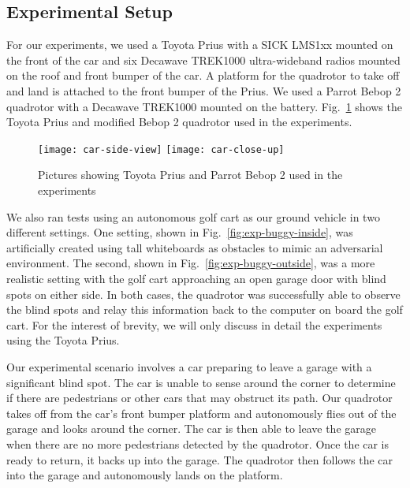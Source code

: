 \subsection{Experimental Setup}

For our experiments, we used a Toyota Prius with a SICK LMS1xx mounted on the
front of the car and six Decawave TREK1000 ultra-wideband radios mounted on the
roof and front bumper of the car. A platform for the quadrotor to take off and
land is attached to the front bumper of the Prius. We used a Parrot Bebop 2
quadrotor with a Decawave TREK1000 mounted on the battery.  Fig.~\ref{fig:car}
shows the Toyota Prius and modified Bebop 2 quadrotor used in the experiments.

\begin{figure}[h!]

    \centering

    \texttt{[image: car-side-view]}
    \texttt{[image: car-close-up]}

    \caption{Pictures showing Toyota Prius and Parrot Bebop 2 used in the
    experiments}

    \label{fig:car}

\end{figure}

We also ran tests using an autonomous golf cart as our ground vehicle in two
different settings.  One setting, shown in Fig.~\ref{fig:exp-buggy-inside}, was
artificially created using tall whiteboards as obstacles to mimic an
adversarial environment. The second, shown in Fig.~\ref{fig:exp-buggy-outside},
was a more realistic setting with the golf cart approaching an open garage door
with blind spots on either side. In both cases, the quadrotor was successfully
able to observe the blind spots and relay this information back to the computer
on board the golf cart. For the interest of brevity, we will only discuss in
detail the experiments using the Toyota Prius.

Our experimental scenario involves a car preparing to leave a garage with a
significant blind spot. The car is unable to sense around the corner to
determine if there are pedestrians or other cars that may obstruct its path.
Our quadrotor takes off from the car's front bumper platform and autonomously
flies out of the garage and looks around the corner. The car is then able to
leave the garage when there are no more pedestrians detected by the quadrotor.
Once the car is ready to return, it backs up into the garage. The quadrotor
then follows the car into the garage and autonomously lands on the platform.

